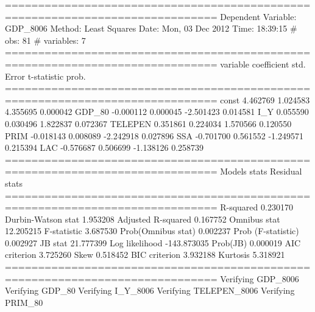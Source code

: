 ==============================================================================
Dependent Variable: GDP_8006
Method: Least Squares
Date:  Mon, 03 Dec 2012
Time:  18:39:15
# obs:                  81
# variables:         7
==============================================================================
variable     coefficient     std. Error      t-statistic     prob.
==============================================================================
const           4.462769      1.024583      4.355695      0.000042
GDP_80          -0.000112      0.000045     -2.501423      0.014581
I_Y             0.055590      0.030496      1.822837      0.072367
TELEPEN           0.351861      0.224034      1.570566      0.120550
PRIM           -0.018143      0.008089     -2.242918      0.027896
SSA            -0.701700      0.561552     -1.249571      0.215394
LAC            -0.576687      0.506699     -1.138126      0.258739
==============================================================================
Models stats                         Residual stats
==============================================================================
R-squared             0.230170         Durbin-Watson stat   1.953208
Adjusted R-squared    0.167752         Omnibus stat         12.205215
F-statistic           3.687530         Prob(Omnibus stat)   0.002237
Prob (F-statistic)    0.002927			JB stat              21.777399
Log likelihood       -143.873035			Prob(JB)             0.000019
AIC criterion         3.725260         Skew                 0.518452
BIC criterion         3.932188         Kurtosis             5.318921
==============================================================================
Verifying GDP_8006
Verifying GDP_80
Verifying I_Y_8006
Verifying TELEPEN_8006
Verifying PRIM_80

